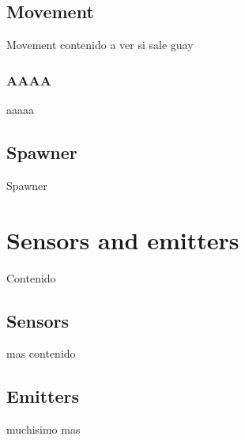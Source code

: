 \subsection{Movement}
Movement contenido a ver si sale guay
\subsubsection{AAAA}
aaaaa
\subsection{Spawner}
Spawner
\section{Sensors and emitters}
Contenido
\subsection{Sensors}
mas contenido
\subsection{Emitters}
muchisimo mas
